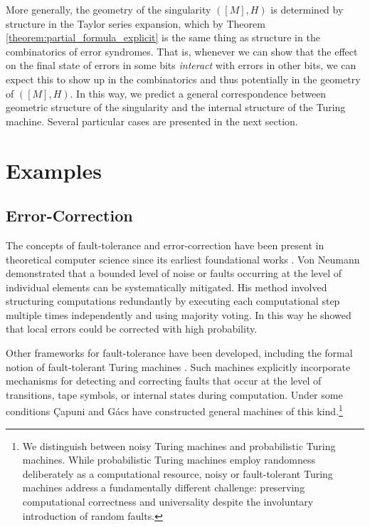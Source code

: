 \documentclass[english,letter paper,12pt,reqno]{article}
\theoremstyle{definition}
\begin{document}
More generally, the geometry of the singularity $([M], H)$ is determined by structure in the Taylor series expansion, which by Theorem \ref{theorem:partial_formula_explicit} is the same thing as structure in the combinatorics of error syndromes. That is, whenever we can show that the effect on the final state of errors in some bits \emph{interact} with errors in other bits, we can expect this to show up in the combinatorics and thus potentially in the geometry of $([M], H)$. In this way, we predict a general correspondence between geometric structure of the singularity and the internal structure of the Turing machine. Several particular cases are presented in the next section.

\section{Examples}
\label{sec:examples}

\subsection{Error-Correction}\label{section:error_correction}

The concepts of fault-tolerance and error-correction have been present in theoretical computer science since its earliest foundational works \cite{von1956probabilistic}. Von Neumann demonstrated that a bounded level of noise or faults occurring at the level of individual elements can be systematically mitigated. His method involved structuring computations redundantly by executing each computational step multiple times independently and using majority voting. In this way he showed that local errors could be corrected with high probability.

Other frameworks for fault-tolerance have been developed, including the formal notion of fault-tolerant Turing machines \cite{pippenger1985networks,spielman1996highly}. Such machines explicitly incorporate mechanisms for detecting and correcting faults that occur at the level of transitions, tape symbols, or internal states during computation. Under some conditions Çapuni and Gács \cite{ccapuni2012turing, çapuni2021reliableturingmachine} have constructed general machines of this kind.\footnote{We distinguish between noisy Turing machines and probabilistic Turing machines. While probabilistic Turing machines employ randomness deliberately as a computational resource, noisy or fault-tolerant Turing machines address a fundamentally different challenge: preserving computational correctness and universality despite the involuntary introduction of random faults.}
\end{document}
